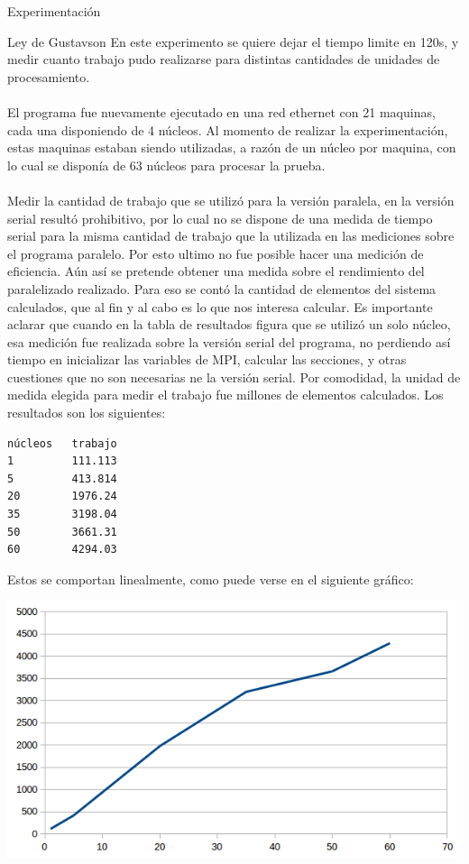 \begin{section}{Experimentación}
\begin{subsection}{Ley de Gustavson}
En este experimento se quiere dejar el tiempo limite en 120s, y medir cuanto trabajo pudo realizarse para distintas cantidades de unidades de procesamiento.
~\\
~\\ 
El programa fue nuevamente ejecutado en una red ethernet con 21 maquinas, cada una disponiendo de 4 núcleos. Al momento de realizar la experimentación, estas maquinas estaban siendo utilizadas, a razón de un núcleo por maquina, con lo cual se disponía de 63 núcleos para procesar la prueba. 
~\\
~\\
Medir la cantidad de trabajo que se utilizó para la versión paralela, en la versión serial resultó prohibitivo, por lo cual no se dispone de una medida de tiempo serial para la misma cantidad de trabajo que la utilizada en las mediciones sobre el programa paralelo. Por esto ultimo no fue posible hacer una medición de eficiencia. Aún así se pretende obtener una medida sobre el rendimiento del paralelizado realizado. Para eso se contó la cantidad de elementos del sistema calculados, que al fin y al cabo es lo que nos interesa calcular. Es importante aclarar que cuando en la tabla de resultados figura que se utilizó un solo núcleo, esa medición fue realizada sobre la versión serial del programa, no perdiendo así tiempo en inicializar las variables de MPI, calcular las secciones, y otras cuestiones que no son necesarias ne la versión serial. Por comodidad, la unidad de medida elegida para medir el trabajo fue millones de elementos calculados. Los resultados son los siguientes:
~\\
\begin{verbatim}
núcleos   trabajo
1         111.113
5         413.814
20        1976.24
35        3198.04
50        3661.31
60        4294.03
\end{verbatim}

Estos se comportan linealmente, como puede verse en el siguiente gráfico:

\includegraphics{Gustavson}


\end{subsection}
\end{section}

